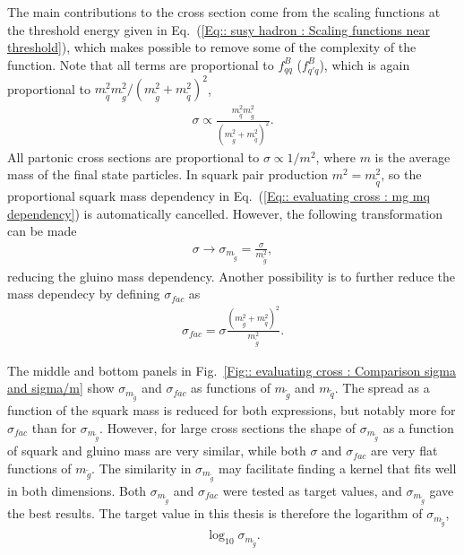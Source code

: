 \documentclass[twoside,english]{uiofysmaster}
\begin{document}
{{The main contributions to the cross section come from the scaling functions at the threshold energy given in Eq.~(\ref{Eq:: susy hadron : Scaling functions near threshold}), which makes possible to remove some of the complexity of the function. Note that all terms are proportional to $f_{qq}^B$ ($f_{q'q}^B$), which is again proportional to $m_{\widetilde{q}}^2 m_{\widetilde{g}}^2/(m_{\widetilde{g}}^2 +m_{\widetilde{q}}^2)^2$,
\begin{align}\label{Eq:: evaluating cross : mg mq dependency}
\sigma \propto \frac{m_{\widetilde{q}}^2 m_{\widetilde{g}}^2}{(m_{\widetilde{g}}^2 +m_{\widetilde{q}}^2)^2}.
\end{align}
All partonic cross sections are proportional to $\sigma \propto 1/m^2$, where $m$ is the average mass of the final state particles. In squark pair production $m^2 = m_{\widetilde{q}}^2$, so the proportional squark mass dependency in Eq.~(\ref{Eq:: evaluating cross : mg mq dependency}) is automatically cancelled. However, the following transformation can be made
\begin{align}
\sigma \rightarrow \sigma_{m_{\widetilde{g}}} = \frac{\sigma}{m_{\widetilde{g}}^2},
\end{align}
reducing the gluino mass dependency. Another possibility is to further reduce the mass dependecy by defining $\sigma_{fac}$ as 
\begin{align}
\sigma_{fac} = \sigma \frac{(m_{\widetilde{g}}^2 + m_{\widetilde{q}}^2)^2}{m_{\widetilde{g}}^2}.
\end{align}


The middle and bottom panels in Fig.~\ref{Fig:: evaluating cross : Comparison sigma and sigma/m} show $\sigma_{m_{\widetilde{g}}}$ and $\sigma_{fac}$ as functions of $m_{\widetilde{g}}$ and $m_{\widetilde{q}}$. The spread as a function of the squark mass is reduced for both expressions, but notably more for $\sigma_{fac}$ than for $\sigma_{m_{\widetilde{g}}}$. However, for large cross sections the shape of $\sigma_{m_{\widetilde{g}}}$ as a function of squark and gluino mass are very similar, while both $\sigma$ and $\sigma_{fac}$ are very flat functions of $m_{\widetilde{g}}$. The similarity in $\sigma_{m_{\widetilde{g}}}$ may facilitate finding a kernel that fits well in both dimensions. Both $\sigma_{m_{\widetilde{g}}}$ and $\sigma_{fac}$ were tested as target values, and $\sigma_{m_{\widetilde{g}}}$ gave the best results. The target value in this thesis is therefore the logarithm of $\sigma_{m_{\widetilde{g}}}$,
\begin{align}
\log_{10} \sigma_{m_{\widetilde{g}}}.
\end{align}

}}
\end{document}
